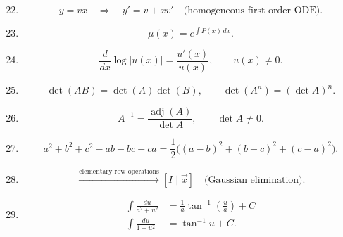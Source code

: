 \begin{enumerate}[label=\theenumi,leftmargin=4mm,itemsep=4pt]
\setcounter{enumi}{21}\item

\begin{equation}
y=vx\quad\Longrightarrow\quad y'=v+xv'
\quad\text{(homogeneous first-order ODE)}.
\label{eq:homogeneous-substitution}
\end{equation}

\setcounter{enumi}{23}\item

\begin{equation}
\mu(x)=e^{\int P(x)\,dx}.
\label{eq:if-24}
\end{equation}

\setcounter{enumi}{24}\item

\begin{equation}
\frac{d}{dx}\log|u(x)|=\frac{u'(x)}{u(x)},\qquad u(x)\ne0.
\label{eq:log-derivative-25}
\end{equation}

\setcounter{enumi}{27}\item

\begin{equation}
\det(AB)=\det(A)\det(B),\qquad
\det(A^n)=(\det A)^n.
\label{eq:det-power}
\end{equation}

\setcounter{enumi}{29}\item

\begin{equation}
A^{-1}=\frac{\operatorname{adj}(A)}{\det A},\qquad \det A\ne0.
\label{eq:inverse-matrix}
\end{equation}

\setcounter{enumi}{35}\item

\begin{equation}
a^2+b^2+c^2-ab-bc-ca
=\frac12\bigl((a-b)^2+(b-c)^2+(c-a)^2\bigr).
\label{eq:sum-squares}
\end{equation}

\setcounter{enumi}{36}\item

\begin{equation}
[A\mid\vec b]\xrightarrow{\text{elementary row operations}}[I\mid\vec x]
\quad\text{(Gaussian elimination)}.
\label{eq:gaussian-elimination}
\end{equation}

\setcounter{enumi}{37}\item

\begin{align}
\int\frac{du}{a^2+u^2}&=\frac1a\tan^{-1}\left(\frac{u}{a}\right)+C
\label{eq:scaled-arctan-integral-38}\\
\int\frac{du}{1+u^2}&=\tan^{-1}u+C.
\label{eq:arctan-integral-38}
\end{align}


\end{enumerate}
